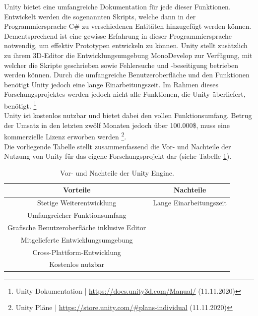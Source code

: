 \documentclass[a4paper,12pt,oneside]{article}
\begin{document}
        Unity bietet eine umfangreiche Dokumentation für jede dieser Funktionen.
        Entwickelt werden die sogenannten Skripts, welche dann in der Programmiersprache
        C\# zu verschiedenen Entitäten hinzugefügt werden können. Dementsprechend ist eine
        gewisse Erfahrung in dieser Programmiersprache notwendig, um effektiv Prototypen
        entwickeln zu können. 
        Unity stellt zusätzlich zu ihrem 3D-Editor die 
        Entwicklungsumgebung MonoDevelop zur Verfügung, mit welcher die Skripte 
        geschrieben sowie Fehlersuche und -beseitigung betrieben werden können.
        Durch die umfangreiche Benutzeroberfläche und den Funktionen benötigt Unity jedoch 
        eine lange Einarbeitungszeit. 
        Im Rahmen dieses Forschungsprojektes werden jedoch nicht alle Funktionen,
        die Unity überliefert, benötigt.
        \footnote{Unity Dokumentation | \url{https://docs.unity3d.com/Manual/} (11.11.2020)}
        \\
        Unity ist kostenlos nutzbar und bietet dabei den vollen Funktionsumfang. Betrug der
        Umsatz in den letzten zwölf Monaten jedoch über 100.000\$, muss eine kommerzielle
        Lizenz erworben werden \footnote{Unity Pläne | \url{https://store.unity.com/\#plans-individual} (11.11.2020)}.
        \\
        Die vorliegende Tabelle stellt zusammenfassend die Vor- und Nachteile der Nutzung
        von Unity für das eigene Forschungsprojekt dar (siehe Tabelle \ref{tab:vor-und-nachteile-unity}).
        \begin{table}[h]
          \begin{center}
            \begin{tabular}{| c | c |}
              \hline
              \textbf{Vorteile} & \textbf{Nachteile} \\ \hline
              Stetige Weiterentwicklung & Lange Einarbeitungszeit \\ \hline
              Umfangreicher Funktionsumfang & \\ \hline
              Grafische Benutzeroberfläche inklusive Editor & \\ \hline
              Mitgelieferte Entwicklungsumgebung & \\ \hline
              Cross-Plattform-Entwicklung & \\ \hline
              Kostenlos nutzbar & \\
              \hline
            \end{tabular}
            \caption{Vor- und Nachteile der Unity Engine.\label{tab:vor-und-nachteile-unity}}
          \end{center}
        \end{table}
\end{document}
